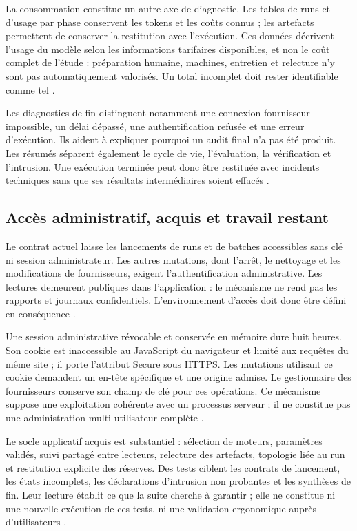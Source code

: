 \documentclass[11pt,a4paper]{article}
\begin{document}
La consommation constitue un autre axe de diagnostic. Les tables de runs et
d'usage par phase conservent les tokens et les coûts connus ; les artefacts
permettent de conserver la restitution avec l'exécution. Ces données décrivent
l'usage du modèle selon les informations tarifaires disponibles, et non le coût
complet de l'étude : préparation humaine, machines, entretien et relecture n'y
sont pas automatiquement valorisés. Un total incomplet doit rester identifiable
comme tel \cite{arch-db,app-batch-tests}.

Les diagnostics de fin distinguent notamment une connexion fournisseur impossible,
un délai dépassé, une authentification refusée et une erreur d'exécution. Ils
aident à expliquer pourquoi un audit final n'a pas été produit. Les résumés
séparent également le cycle de vie, l'évaluation, la vérification et l'intrusion.
Une exécution terminée peut donc être restituée avec incidents techniques sans
que ses résultats intermédiaires soient effacés \cite{app-runs,app-summary-tests}.

\subsection{Accès administratif, acquis et travail restant}
Le contrat actuel laisse les lancements de runs et de batches accessibles
sans clé ni session administrateur. Les autres mutations, dont l'arrêt,
le nettoyage et les modifications de fournisseurs, exigent l'authentification
administrative. Les lectures demeurent publiques dans l'application : le
mécanisme ne rend pas les rapports et journaux confidentiels. L'environnement
d'accès doit donc être défini en conséquence \cite{app-auth-guide,sec-session}.

Une session administrative révocable et conservée en mémoire dure huit heures.
Son cookie est inaccessible au JavaScript du navigateur et limité aux requêtes
du même site ; il porte l'attribut Secure sous HTTPS. Les mutations utilisant
ce cookie demandent un en-tête spécifique et une origine admise. Le gestionnaire
des fournisseurs conserve son champ de clé pour ces opérations. Ce mécanisme
suppose une exploitation cohérente avec un processus serveur ; il ne constitue
pas une administration multi-utilisateur complète
\cite{sec-session,app-auth-guide}.

Le socle applicatif acquis est substantiel : sélection de moteurs, paramètres
validés, suivi partagé entre lecteurs, relecture des artefacts, topologie liée
au run et restitution explicite des réserves. Des tests ciblent les contrats
de lancement, les états incomplets, les déclarations d'intrusion non probantes
et les synthèses de fin. Leur lecture établit ce que la suite cherche à garantir ;
elle ne constitue ni une nouvelle exécution de ces tests, ni une validation
ergonomique auprès d'utilisateurs \cite{app-start-tests,app-rules-tests,app-intrusion-tests,app-summary-tests}.
\end{document}
